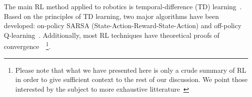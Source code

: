 






    The main RL method applied to robotics is temporal-difference (TD) learning~\parencite{Sutton1988, Bradtke1996}. Based on the principles of TD learning, two major algorithms have been developed: on-policy SARSA (State-Action-Reward-State-Action) and off-policy Q-learning~\parencite{Watkins1989}. Additionally, most RL techniques have theoretical proofs of convergence~\parencite{Panait2005}~\footnote{Please note that what we have presented here is only a crude summary of RL in order to give sufficient context to the rest of our discussion. We point those interested by the subject to more exhaustive litterature~\parencite{Sutton1998, Deisenroth2011}}.


